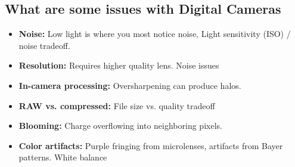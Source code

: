 \documentclass{article}
\begin{document}
\subsection{What are some issues with Digital Cameras}
\begin{itemize}
    \item \textbf{Noise:} Low light is where you most notice noise, Light sensitivity (ISO) / noise                tradeoff.
    \item \textbf{Resolution:} Requires higher quality lens. Noise issues
    \item \textbf{In-camera processing:} Oversharpening can produce halos.
    \item \textbf{RAW vs. compressed:} File size vs. quality tradeoff
    \item \textbf{Blooming:} Charge overflowing into neighboring pixels.
    \item \textbf{Color artifacts:} Purple fringing from microlenses, artifacts from Bayer
        patterns. White balance
\end{itemize}
\end{document}
